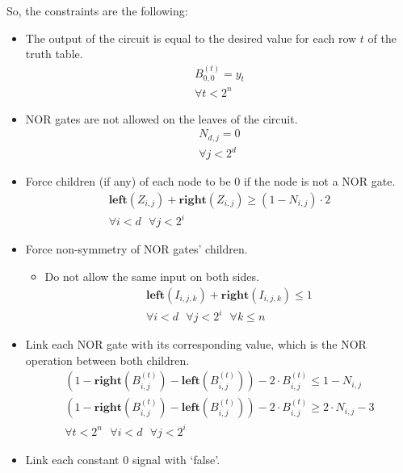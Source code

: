 \documentclass[letterpaper,10pt]{article}
\begin{document}
So, the constraints are the following:
\begin{itemize}
    \item The output of the circuit is equal to the desired value for each row $t$ of the truth table.
    \begin{align*}
        B_{0,0}^{(t)} = y_t \\
        \forall t < 2^n
    \end{align*}
    \item NOR gates are not allowed on the leaves of the circuit.
    \begin{align*}
        N_{d,j} = 0 \\
        \forall j < 2^d 
    \end{align*}
    \item Force children (if any) of each node to be 0 if the node is not a NOR gate.
    \begin{align*}
        \mathbf{left}(Z_{i,j}) + \mathbf{right}(Z_{i,j}) \geq (1-N_{i,j})\cdot 2 \\
        \forall i < d\text{ }\forall j < 2^i
    \end{align*}
    \item Force non-symmetry of NOR gates' children.
    \begin{itemize}
        \item Do not allow the same input on both sides.
            \begin{align*}
                \mathbf{left}(I_{i,j,k}) + \mathbf{right}(I_{i,j,k}) \leq 1 \\
                \forall i < d\text{ }\forall j < 2^i\text{ }\forall k \leq n
            \end{align*}
    \end{itemize}
    \item Link each NOR gate with its corresponding value, which is the NOR operation between both children.
    \begin{align*}
        (1 - \mathbf{right}(B_{i,j}^{(t)}) - \mathbf{left}(B_{i,j}^{(t)})) - 2\cdot B_{i,j}^{(t)} \leq 1-N_{i,j} \\
   (1 - \mathbf{right}(B_{i,j}^{(t)}) - \mathbf{left}(B_{i,j}^{(t)})) - 2\cdot B_{i,j}^{(t)} \geq 2 \cdot N_{i,j} - 3 \\
        \forall t < 2^n\text{ }\forall i < d\text{ }\forall j < 2^i
    \end{align*}
    \item Link each constant 0 signal with `false'.
    \begin{align*}

\end{align*}
\end{itemize}
\end{document}
